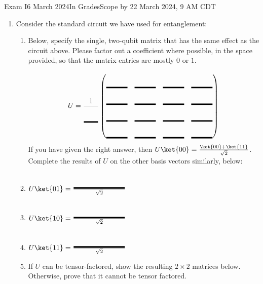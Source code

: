 \documentclass[12pt]{article}
\newcommand{\Blank}[1][1in]{\mbox{\vrule width #1 depth 2pt}\vrule width 0pt height 2.0em}
\def\EmptyFourByFour{%
\frac{1}{\Blank[2em]} \begin{pmatrix*}[r]
 \Blank[3em]{} & \Blank[3em]{} & \Blank[3em]{} & \Blank[3em]{} \\
 \Blank[3em]{} & \Blank[3em]{} & \Blank[3em]{} & \Blank[3em]{} \\
 \Blank[3em]{} & \Blank[3em]{} & \Blank[3em]{} & \Blank[3em]{} \\
 \Blank[3em]{} & \Blank[3em]{} & \Blank[3em]{} & \Blank[3em]{}\end{pmatrix*}}
\begin{document}
\begin{assignment}{Exam I}{6 March 2024}{In GradesScope by 22 March 2024, 9 AM CDT}
\begin{enumerate}
\begin{enumerate}
Applying a Hadamard to each state of $\ket{\psi_{abe}}$ produces:
\[
\ket{\psi_{xxx}} = \frac{1}{\Blank[2em]}\begin{pmatrix*}
\Blank[2em] \\
\Blank[2em] \\
\Blank[2em] \\
\Blank[2em] \\
\Blank[2em] \\
\Blank[2em] \\
\Blank[2em] \\
\Blank[2em] 
\end{pmatrix*}
\]
\item{} What are the possible
outcomes for Alice's and Bob's measurements of $\ket{\psi_{xxx}}$ in
the computational basis?

\item{} How can Alice and Bob catch Eve's presence in
$\ket{\psi_{abe}}$ now?
\end{enumerate}




\clearpage\item{} Consider the standard circuit we have used for
entanglement:
\begin{center}   
    \end{center}
\begin{enumerate}
\item{}
Below, specify the single, two-qubit matrix that has the same effect as
the circuit above.  Please factor out a coefficient where possible, in
the space provided,  so that
the matrix entries are mostly $0$ or $1$.

{\small
\[
U = \EmptyFourByFour{} \]}
If you have given the right answer, then $U\ket{00}=\frac{\ket{00}+\ket{11}}{\sqrt{2}}$.  Complete the results of $U$ on the other basis vectors similarly, below:

\item{} $U\ket{01}=\frac{\Blank{}}{\sqrt{2}}$
\item{} $U\ket{10}=\frac{\Blank{}}{\sqrt{2}}$
\item{} $U\ket{11}=\frac{\Blank{}}{\sqrt{2}}$
\item{} If $U$ can be tensor-factored, show the resulting $2\times 2$ matrices below. Otherwise, prove that it cannot be tensor factored.
\end{enumerate}






\end{enumerate}
\end{assignment}
\end{document}
